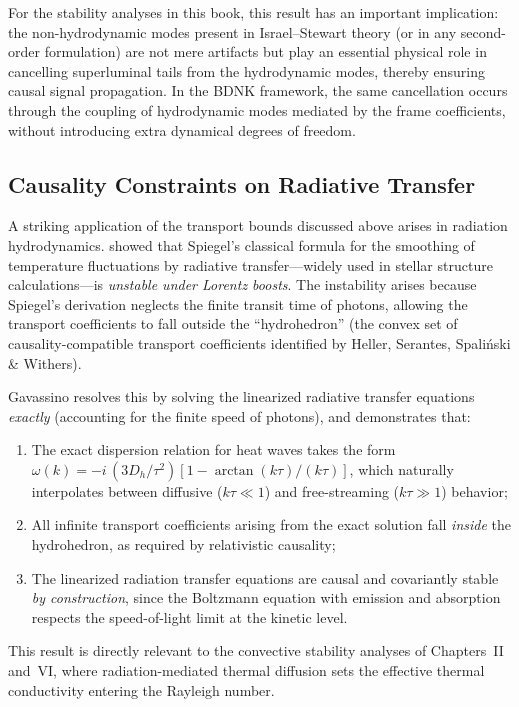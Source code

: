 For the stability analyses in this book, this result has an
important implication: the non-hydrodynamic modes present in
Israel--Stewart theory (or in any second-order formulation) are not
mere artifacts but play an essential physical role in cancelling
superluminal tails from the hydrodynamic modes, thereby ensuring
causal signal propagation.  In the BDNK framework, the same
cancellation occurs through the coupling of hydrodynamic modes
mediated by the frame coefficients, without introducing extra
dynamical degrees of freedom.

\subsection{Causality Constraints on Radiative Transfer}
\label{subsec:causal-rad-transfer}

A striking application of the transport bounds discussed above arises
in radiation hydrodynamics.  \citet{GavassinoCausalRadTransfer2025}
showed that Spiegel's classical formula for the smoothing of
temperature fluctuations by radiative transfer---widely used in
stellar structure calculations---is \emph{unstable under Lorentz
boosts}.  The instability arises because Spiegel's derivation neglects
the finite transit time of photons, allowing the transport coefficients
to fall outside the ``hydrohedron'' (the convex set of
causality-compatible transport coefficients identified by Heller,
Serantes, Spali\'nski \& Withers).

Gavassino resolves this by solving the linearized radiative transfer
equations \emph{exactly} (accounting for the finite speed of photons),
and demonstrates that:
\begin{enumerate}
  \item The exact dispersion relation for heat waves takes the form
    $\omega(k) = -i\,(3D_h/\tau^2)[1 - \arctan(k\tau)/(k\tau)]$,
    which naturally interpolates between diffusive ($k\tau \ll 1$) and
    free-streaming ($k\tau \gg 1$) behavior;
  \item All infinite transport coefficients arising from the exact
    solution fall \emph{inside} the hydrohedron, as required by
    relativistic causality;
  \item The linearized radiation transfer equations are causal and
    covariantly stable \emph{by construction}, since the Boltzmann
    equation with emission and absorption respects the speed-of-light
    limit at the kinetic level.
\end{enumerate}
This result is directly relevant to the convective stability analyses
of Chapters~II and~VI, where radiation-mediated thermal diffusion
sets the effective thermal conductivity entering the Rayleigh number.

